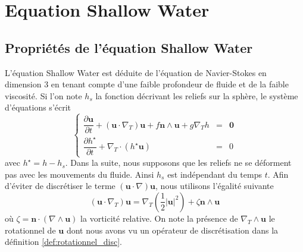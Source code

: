 \section{Equation Shallow Water}

\subsection{Propriétés de l'équation Shallow Water}

L'équation Shallow Water est déduite de l'équation de Navier-Stokes en dimension 3 en tenant compte d'une faible profondeur de fluide et de la faible viscosité. Si l'on note $h_s$ la fonction décrivant les reliefs sur la sphère, le système d'équations s'écrit
\begin{equation}
\label{eq:SWEC_new}
\left\lbrace
\begin{array}{rcl}
\dfrac{\partial \mathbf{u}}{\partial t} + \left( \mathbf{u} \cdot \nabla_T \right) \mathbf{u} + f \mathbf{n} \wedge \mathbf{u} + g \nabla_T h & = & \mathbf{0} \\
\dfrac{\partial h^{\star}}{\partial t} + \nabla_T \cdot \left( h^{\star} \mathbf{u} \right) & = & 0
\end{array}
\right.
\end{equation}
avec $h^{\star} = h - h_s$. Dans la suite, nous supposons que les reliefs ne se déforment pas avec les mouvements du fluide. Ainsi $h_s$ est indépendant du temps $t$.
Afin d'éviter de discrétiser le terme $\left( \mathbf{u} \cdot \nabla \right) \mathbf{u}$, nous utilisons l'égalité suivante 
\begin{equation}
\left( \mathbf{u} \cdot \nabla_T \right) \mathbf{u} = \nabla_T \left( \dfrac{1}{2} |\mathbf{u}|^2 \right) + \zeta \mathbf{n} \wedge \mathbf{u}
\end{equation}
où $\zeta = \mathbf{n} \cdot \left( \nabla \wedge \mathbf{u} \right)$ la vorticité relative. On note la présence de $\nabla_T \wedge \mathbf{u}$ le rotationnel de $\mathbf{u}$ dont nous avons vu un opérateur de discrétisation dans la définition \ref{def:rotationnel_disc}.

